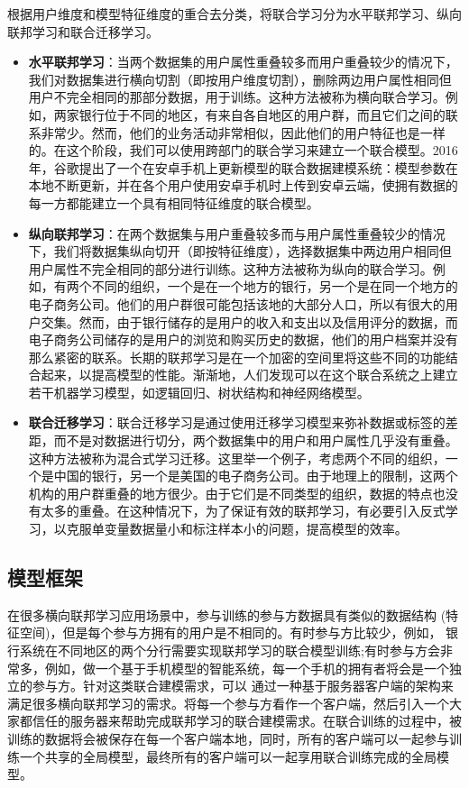 根据用户维度和模型特征维度的重合去分类，将联合学习分为水平联邦学习、纵向联邦学习和联合迁移学习\cite{ref26}。
\begin{itemize}
\item \textbf{水平联邦学习}：当两个数据集的用户属性重叠较多而用户重叠较少的情况下，我们对数据集进行横向切割（即按用户维度切割），删除两边用户属性相同但用户不完全相同的那部分数据，用于训练。这种方法被称为横向联合学习。例如，两家银行位于不同的地区，有来自各自地区的用户群，而且它们之间的联系非常少。然而，他们的业务活动非常相似，因此他们的用户特征也是一样的。在这个阶段，我们可以使用跨部门的联合学习来建立一个联合模型。2016年，谷歌提出了一个在安卓手机上更新模型的联合数据建模系统：模型参数在本地不断更新，并在各个用户使用安卓手机时上传到安卓云端，使拥有数据的每一方都能建立一个具有相同特征维度的联合模型。

\item \textbf{纵向联邦学习}：在两个数据集与用户重叠较多而与用户属性重叠较少的情况下，我们将数据集纵向切开（即按特征维度），选择数据集中两边用户相同但用户属性不完全相同的部分进行训练。这种方法被称为纵向的联合学习。例如，有两个不同的组织，一个是在一个地方的银行，另一个是在同一个地方的电子商务公司。他们的用户群很可能包括该地的大部分人口，所以有很大的用户交集。然而，由于银行储存的是用户的收入和支出以及信用评分的数据，而电子商务公司储存的是用户的浏览和购买历史的数据，他们的用户档案并没有那么紧密的联系。长期的联邦学习是在一个加密的空间里将这些不同的功能结合起来，以提高模型的性能。渐渐地，人们发现可以在这个联合系统之上建立若干机器学习模型，如逻辑回归、树状结构和神经网络模型。

\item \textbf{联合迁移学习}：联合迁移学习是通过使用迁移学习模型来弥补数据或标签的差距，而不是对数据进行切分，两个数据集中的用户和用户属性几乎没有重叠。这种方法被称为混合式学习迁移。这里举一个例子，考虑两个不同的组织，一个是中国的银行，另一个是美国的电子商务公司。由于地理上的限制，这两个机构的用户群重叠的地方很少。由于它们是不同类型的组织，数据的特点也没有太多的重叠。在这种情况下，为了保证有效的联邦学习，有必要引入反式学习，以克服单变量数据量小和标注样本小的问题，提高模型的效率。

\end{itemize}

\subsection{模型框架}
在很多横向联邦学习应用场景中，参与训练的参与方数据具有类似的数据结构 (特征空间)，但是每个参与方拥有的用户是不相同的。有时参与方比较少，例如， 银行系统在不同地区的两个分行需要实现联邦学习的联合模型训练;有时参与方会非常多，例如，做一个基于手机模型的智能系统，每一个手机的拥有者将会是一个独立的参与方。针对这类联合建模需求，可以 通过一种基于服务器客户端的架构来满足很多横向联邦学习的需求。将每一个参与方看作一个客户端，然后引入一个大家都信任的服务器来帮助完成联邦学习的联合建模需求。在联合训练的过程中，被训练的数据将会被保存在每一个客户端本地，同时，所有的客户端可以一起参与训练一个共享的全局模型，最终所有的客户端可以一起享用联合训练完成的全局模型。

